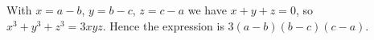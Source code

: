 With $x=a-b$, $y=b-c$, $z=c-a$ we have $x+y+z=0$, so $x^3+y^3+z^3=3xyz$. Hence the expression is $\boxed{3(a-b)(b-c)(c-a)}$.
